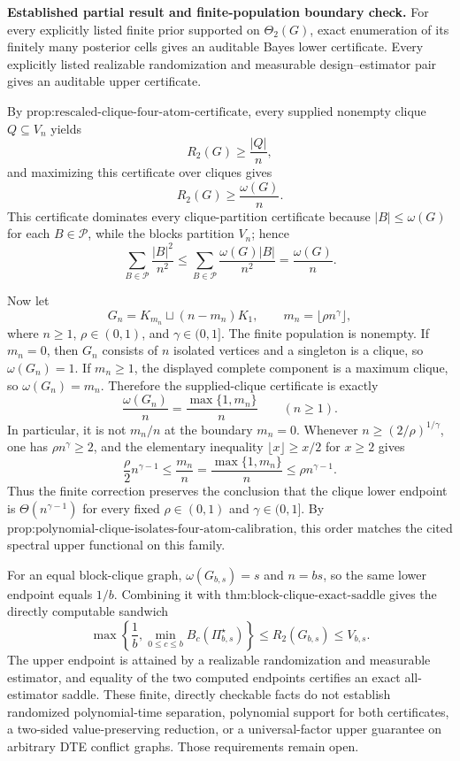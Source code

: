 \textbf{Established partial result and finite-population boundary check.}
For every explicitly listed finite prior supported on \(\Theta_2(G)\), exact enumeration of its finitely many posterior cells gives an auditable Bayes lower certificate.  Every explicitly listed realizable randomization and measurable design--estimator pair gives an auditable upper certificate.

By \(\text{prop:rescaled-clique-four-atom-certificate}\), every supplied nonempty clique \(Q\subseteq V_n\) yields
\[
R_2(G)\geq \frac{|Q|}{n},
\]
and maximizing this certificate over cliques gives
\[
R_2(G)\geq \frac{\omega(G)}{n}.
\]
This certificate dominates every clique-partition certificate because \(|B|\leq\omega(G)\) for each \(B\in\mathcal P\), while the blocks partition \(V_n\); hence
\[
\sum_{B\in\mathcal P}\frac{|B|^2}{n^2}
\leq
\sum_{B\in\mathcal P}\frac{\omega(G)|B|}{n^2}
=\frac{\omega(G)}{n}.
\]

Now let
\[
G_n=K_{m_n}\sqcup(n-m_n)K_1,
\qquad
m_n=\lfloor\rho n^\gamma\rfloor,
\]
where \(n\geq1\), \(\rho\in(0,1)\), and \(\gamma\in(0,1]\).  The finite population is nonempty.  If \(m_n=0\), then \(G_n\) consists of \(n\) isolated vertices and a singleton is a clique, so \(\omega(G_n)=1\).  If \(m_n\geq1\), the displayed complete component is a maximum clique, so \(\omega(G_n)=m_n\).  Therefore the supplied-clique certificate is exactly
\[
\frac{\omega(G_n)}{n}
=\frac{\max\{1,m_n\}}{n}
\qquad(n\geq1).
\]
In particular, it is not \(m_n/n\) at the boundary \(m_n=0\).  Whenever \(n\geq(2/\rho)^{1/\gamma}\), one has \(\rho n^\gamma\geq2\), and the elementary inequality \(\lfloor x\rfloor\geq x/2\) for \(x\geq2\) gives
\[
\frac{\rho}{2}n^{\gamma-1}
\leq \frac{m_n}{n}
=\frac{\max\{1,m_n\}}{n}
\leq \rho n^{\gamma-1}.
\]
Thus the finite correction preserves the conclusion that the clique lower endpoint is \(\Theta(n^{\gamma-1})\) for every fixed \(\rho\in(0,1)\) and \(\gamma\in(0,1]\).  By \(\text{prop:polynomial-clique-isolates-four-atom-calibration}\), this order matches the cited spectral upper functional on this family.

For an equal block-clique graph, \(\omega(G_{b,s})=s\) and \(n=bs\), so the same lower endpoint equals \(1/b\).  Combining it with \(\text{thm:block-clique-exact-saddle}\) gives the directly computable sandwich
\[
\max\left\{\frac1b,\min_{0\leq c\leq b}B_c(\Pi_{b,s}^{\star})\right\}
\leq R_2(G_{b,s})\leq V_{b,s}.
\]
The upper endpoint is attained by a realizable randomization and measurable estimator, and equality of the two computed endpoints certifies an exact all-estimator saddle.  These finite, directly checkable facts do not establish randomized polynomial-time separation, polynomial support for both certificates, a two-sided value-preserving reduction, or a universal-factor upper guarantee on arbitrary DTE conflict graphs.  Those requirements remain open.